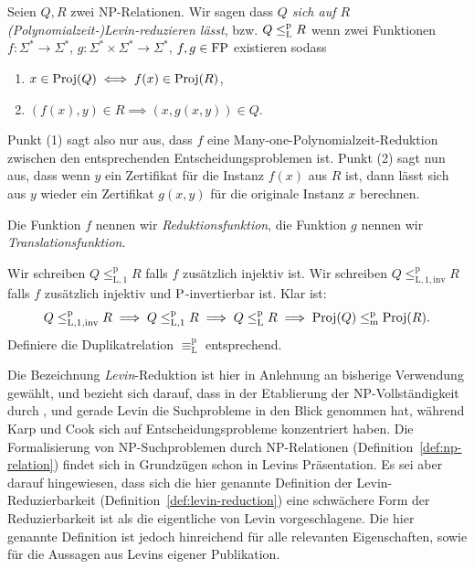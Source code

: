 \begin{definition}\label{def:levin-reduction}
    Seien $Q, R$ zwei NP-Relationen. Wir sagen dass \emph{$Q$ sich auf $R$ (Polynomialzeit-)Levin-reduzieren lässt}, bzw. $Q\leqlp R$ wenn zwei Funktionen $f:\Sigma^*\to\Sigma^*$, $g:\Sigma^*\times\Sigma^*\to\Sigma^*$, $f, g\in \FP$ existieren sodass
    \begin{enumerate}
        \item $x\in\Proj(Q) \iff f(x)\in\Proj(R)$,
        \item $(f(x), y)\in R \implies (x, g(x,y))\in Q$.
    \end{enumerate}
    Punkt (1) sagt also nur aus, dass $f$ eine Many-one-Polynomialzeit-Reduktion zwischen den entsprechenden Entscheidungsproblemen ist.
    Punkt (2) sagt nun aus, dass wenn $y$ ein Zertifikat für die Instanz $f(x)$ aus $R$ ist, dann lässt sich aus $y$ wieder ein Zertifikat $g(x,y)$ für die originale Instanz $x$ berechnen.

    Die Funktion $f$ nennen wir \emph{Reduktionsfunktion}, die Funktion $g$ nennen wir \emph{Translationsfunktion}.

    Wir schreiben $Q\leq_\mathrm{L,1}^\mathrm p R$ falls $f$ zusätzlich injektiv ist. Wir schreiben $Q\leq_\mathrm{L,1,inv}^\mathrm p R$ falls $f$ zusätzlich injektiv und $\P$-invertierbar ist. Klar ist:
    \[ Q\leq_\mathrm{L,1,inv}^\mathrm p R \implies Q \leq_\mathrm{L,1}^\mathrm p R \implies Q \leqlp R \implies \Proj(Q) \leqmp \Proj(R).\]
    Definiere die Duplikatrelation $\equiv_\mathrm L^\mathrm p$ entsprechend.
\end{definition}
Die Bezeichnung \emph{Levin}-Reduktion ist hier in Anlehnung an bisherige Verwendung gewählt, und bezieht sich darauf, dass in der Etablierung der NP-Vollständigkeit durch \textcite{karp_reducibility_1972}, \textcite{cook_complexity_1971} und \textcite{levin_universal_1973} gerade Levin die Suchprobleme in den Blick genommen hat, während Karp und Cook sich auf Entscheidungsprobleme konzentriert haben. Die Formalisierung von NP-Suchproblemen durch NP-Relationen (Definition~\ref{def:np-relation}) findet sich in Grundzügen schon in Levins Präsentation. Es sei aber darauf hingewiesen, dass sich die hier genannte Definition der Levin-Reduzierbarkeit (Definition~\ref{def:levin-reduction}) eine schwächere Form der Reduzierbarkeit ist als die eigentliche von Levin vorgeschlagene. Die hier genannte Definition ist jedoch hinreichend für alle relevanten Eigenschaften, sowie für die Aussagen aus Levins eigener Publikation.

